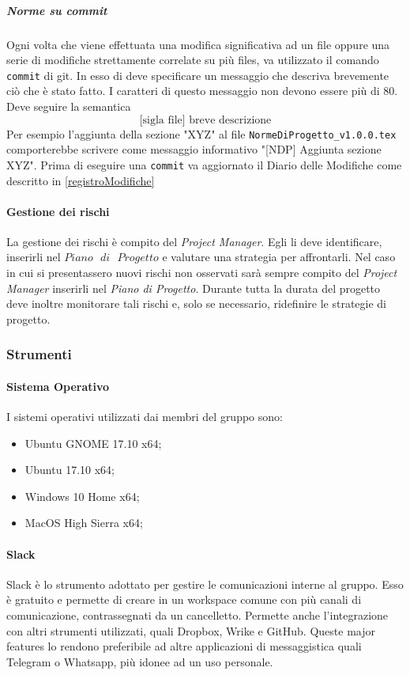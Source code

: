 			\subparagraph{Norme su commit}\Spazio
			Ogni volta che viene effettuata una modifica significativa ad un file oppure una serie di modifiche strettamente correlate su più files, va utilizzato il comando \texttt{commit} di git. In esso di deve specificare un messaggio che descriva brevemente ciò che è stato fatto. I caratteri di questo messaggio non devono essere più di 80. Deve seguire la semantica
			$$\text{[sigla file] breve descrizione}$$
			Per esempio l'aggiunta della sezione "XYZ" al file \texttt{NormeDiProgetto\_v1.0.0.tex} comporterebbe scrivere come messaggio informativo "[NDP] Aggiunta sezione XYZ". Prima di eseguire una \texttt{commit} va aggiornato il Diario delle Modifiche come descritto in \ref{registroModifiche}
			
		\paragraph{Gestione dei rischi} \Spazio
		La gestione dei rischi è compito del \emph{Project Manager}. Egli li deve identificare, inserirli nel $Piano\text{ }di\text{ }Progetto$ e valutare una strategia per affrontarli. Nel caso in cui si presentassero nuovi rischi non osservati sarà sempre compito del \emph{Project Manager} inserirli nel \emph{Piano di Progetto}. Durante tutta la durata del progetto deve inoltre monitorare tali rischi e, solo se necessario, ridefinire le strategie di progetto.
		
	\subsubsection{Strumenti}
		\paragraph{Sistema Operativo} \Spazio
		I sistemi operativi utilizzati dai membri del gruppo sono:
		\begin{itemize}
			\item Ubuntu GNOME 17.10 x64;
			\item Ubuntu 17.10 x64;
			\item Windows 10 Home x64;
			\item MacOS High Sierra x64;
		\end{itemize}
		
		\paragraph{Slack}\Spazio
		Slack è lo strumento adottato per gestire le comunicazioni interne al gruppo. Esso è gratuito e permette di creare in un workspace comune con più canali di comunicazione, contrassegnati da un cancelletto. Permette anche l'integrazione con altri strumenti utilizzati, quali Dropbox, Wrike e GitHub. Queste major features lo rendono preferibile ad altre applicazioni di messaggistica quali Telegram o Whatsapp, più idonee ad un uso personale. 
		
